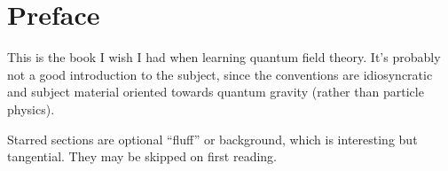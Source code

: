 \chapter*{Preface}

\M
This is the book I wish I had when learning quantum field theory.
It's probably not a good introduction to the subject, since the
conventions are idiosyncratic and subject material oriented towards
quantum gravity (rather than particle physics).

Starred sections are optional ``fluff'' or background, which is
interesting but tangential. They may be skipped on first reading.
